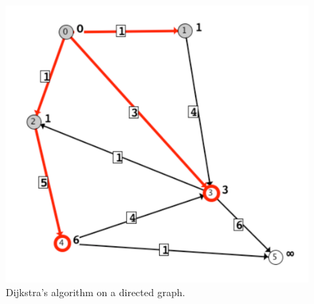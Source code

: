 \begin{figure}[p]

\begin{center}
\includegraphics[scale=0.55]{X_dijkstra_directed}
\end{center}

\caption{Dijkstra's algorithm on a directed graph.}
\label{fig:dijkstra_directed}
\end{figure}
